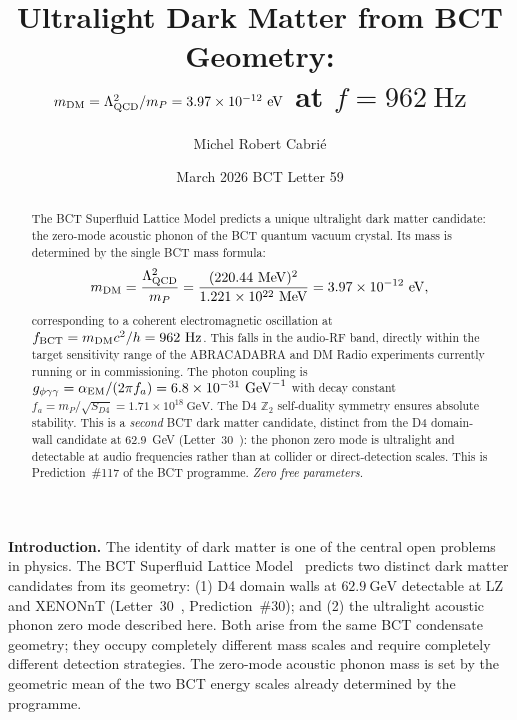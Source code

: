 \documentclass[aps,prl,twocolumn,superscriptaddress,floatfix]{revtex4-2}
\begin{document}
\title{Ultralight Dark Matter from BCT Geometry:\\
$m_{\rm DM} = \Lambda_{\rm QCD}^2/m_P = 3.97\times10^{-12}\ \mathrm{eV}$
at $f = 962\ \mathrm{Hz}$}

\author{Michel Robert Cabri\'e}

\date{March 2026 \quad BCT Letter 59}

\begin{abstract}
The BCT Superfluid Lattice Model predicts a unique ultralight dark matter candidate:
the zero-mode acoustic phonon of the BCT quantum vacuum crystal.
Its mass is determined by the single BCT mass formula:
\[
  m_{\rm DM} = \frac{\Lambda_{\rm QCD}^2}{m_P}
  = \frac{(220.44\ \mathrm{MeV})^2}{1.221\times10^{22}\ \mathrm{MeV}}
  = 3.97\times10^{-12}\ \mathrm{eV},
\]
corresponding to a coherent electromagnetic oscillation at $f_{\rm BCT} = m_{\rm DM}c^2/h = 962\ \mathrm{Hz}$.
This falls in the audio-RF band, directly within the target sensitivity range of the
ABRACADABRA and DM Radio experiments currently running or in commissioning.
The photon coupling is $g_{\phi\gamma\gamma} = \alpha_{\rm EM}/(2\pi f_a) = 6.8\times10^{-31}\ \mathrm{GeV}^{-1}$
with decay constant $f_a = m_P/\sqrt{S_{D4}} = 1.71\times10^{18}\ \mathrm{GeV}$.
The D4 $\mathbb{Z}_2$ self-duality symmetry ensures absolute stability.
This is a \emph{second} BCT dark matter candidate, distinct from the D4 domain-wall
candidate at 62.9~GeV (Letter~30~\cite{L30}): the phonon zero mode is ultralight
and detectable at audio frequencies rather than at collider or direct-detection scales.
This is Prediction~\#117 of the BCT programme. \textit{Zero free parameters.}
\end{abstract}

\maketitle

\noindent\textbf{Introduction.}
The identity of dark matter is one of the central open problems in physics.
The BCT Superfluid Lattice Model~\cite{Monograph,PRL} predicts two distinct
dark matter candidates from its geometry: (1) D4 domain walls at $62.9\ \mathrm{GeV}$
detectable at LZ and XENONnT (Letter~30~\cite{L30}, Prediction~\#30); and (2) the
ultralight acoustic phonon zero mode described here. Both arise from the same BCT
condensate geometry; they occupy completely different mass scales and require
completely different detection strategies.
The zero-mode acoustic phonon mass is set by the geometric mean of the two BCT
energy scales already determined by the programme.
\end{document}
